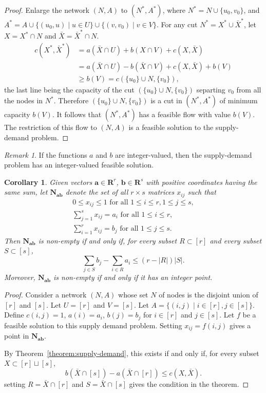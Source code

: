 \documentclass{amsbook}
\newcommand{\bb}{\mathbf b}
\renewcommand{\aa}{\mathbf a}
\newcommand{\RR}{\mathbf R}
\newcommand{\NN}{\mathbf N}
\newtheorem{corollary}[theorem]{Corollary}
\theoremstyle{definition}
\theoremstyle{remark}
\newtheorem{remark}[theorem]{Remark}
\begin{document}
\begin{proof}
  Enlarge the network $(N,A)$ to $(N^*,A^*)$, where $N^*=N\cup\{u_0,v_0\}$, and $A^*=A\cup\{(u_0,u)\mid u\in U\}\cup \{(v,v_0)\mid v\in V\}$.
  For any cut $N^*=X^*\cup \bar X^*$, let $X=X^*\cap N$ and $\bar X = \bar X^*\cap N$.
  \begin{align*}
    c(X^*,\bar X^*) & = a(\bar X\cap U) + b(X\cap V) + c(X,\bar X)\\
                    & = a(\bar X\cap U) - b(\bar X\cap V) + c(X,\bar X) + b(V)\\
                    & \geq b(V)=c(\{u_0\}\cup N,\{v_0\}), 
  \end{align*}
  the last line being the capacity of the cut $(\{u_0\}\cup N,\{v_0\})$ separting $v_0$ from all the nodes in $N^*$.
  Therefore $(\{u_0\}\cup N,\{v_0\})$ is a cut in $(N^*,A^*)$ of minimum capacity $b(V)$.
  It follows that $(N^*,A^*)$ has a feasible flow with value $b(V)$.
  The restriction of this flow to $(N,A)$ is a feasible solution to the supply-demand problem.
\end{proof}
\begin{remark}
  If the functions $a$ and $b$ are integer-valued, then the supply-demand problem has an integer-valued feasible solution.
\end{remark}
\begin{corollary}
  Given vectors $\aa\in \RR^r$, $\bb\in \RR^s$ with positive coordinates having the same sum, let $\NN_{\aa\bb}$ denote the set of all $r\times s$ matrices $x_{ij}$ such that
  \begin{gather*}
    0\leq x_{ij}\leq 1 \text{ for all }1\leq i\leq r,1\leq j\leq s,\\
    \sum_{j=1}^s x_{ij} =  a_i \text{ for all } 1\leq i\leq r,\\
    \sum_{i=1}^r x_{ij} =  b_j \text{ for all } 1\leq j\leq s.
  \end{gather*}
  Then $\NN_{\aa\bb}$ is non-empty if and only if, for every subset $R\subset [r]$ and every subset $S\subset [s]$,
  \begin{displaymath}
    \sum_{j\in S} b_j - \sum_{i\in R} a_i \leq (r-|R|)|S|.
  \end{displaymath}
  Moreover, $\NN_{\aa\bb}$ is non-empty if and only if it has an integer point.
\end{corollary}
\begin{proof}
  Consider a network $(N,A)$ whose set $N$ of nodes is the disjoint union of $[r]$ and $[s]$.
  Let $U=[r]$ and $V=[s]$.
  Let $A=\{(i,j)\mid i\in [r],j\in [s]\}$.
  Define $c(i,j)=1$, $a(i)=a_i$, $b(j)=b_j$ for $i\in [r]$ and $j\in [s]$.
  Let $f$ be a feasible solution to this supply demand problem.
  Setting $x_{ij}=f(i,j)$ gives a point in $\NN_{\aa\bb}$.

  By Theorem~\ref{theorem:supply-demand}, this exists if and only if, for every subset $X\subset [r]\sqcup [s]$,
  \begin{displaymath}
    b(\bar X\cap [s]) - a(\bar X\cap [r]) \leq c(X,\bar X).
  \end{displaymath}
  setting $R=\bar X\cap [r]$ and $S=\bar X\cap [s]$ gives the condition in the theorem.
\end{proof}
\end{document}
